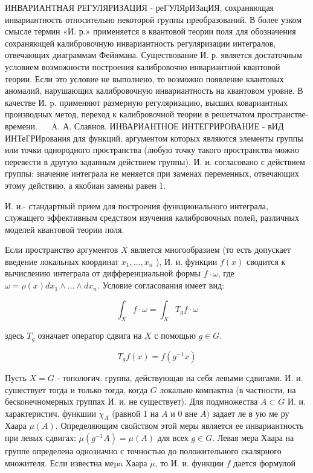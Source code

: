 \documentclass[10pt]{article}
\begin{document}
ИНВАРИАНТНАЯ РЕГУЛЯРИЗАЦИЯ - реГУЛЯрИЗацИЯ, сохраняющая инвариантность относительно некоторой группы преобразований. В более узком смысле термин «И. р.» применяется в квантовой теории поля для обозначения сохраняющей калибровочную инвариантность регуляризации интегралов, отвечающих диаграммам Фейнмана. Существование И. р. является достаточным условием возможности построения калибровочно инвариантной квантовой теории. Если это условие не выполнено, то возможно появление квантовых аномалий, нарушающих калибровочную инвариантность на квантовом уровне. В качестве И. p. применяют размерную регуляризацию, высших ковариантных производных метод, переход к калибровочной теории в решетчатом пространстве-времени. $\quad$ A. А. Славнов. ИНВАРИАНТНОЕ ИНТЕГРИРОВАНИЕ - вИД ИНТеГРИрования для функций, аргументом которых являются элементы группы или точки однородного пространства (любую точку такого пространства можно перевести в другую заданным действием группы). И. и. согласовано с действием группы: значение интеграла не меняется при заменах переменных, отвечающих этому действию, а якобиан замены равен 1.



И. и.- стандартный прием для построения функционального интеграла, служащего эффективным средством изучения калибровочных полей, различных моделей квантовой теории поля.



Если пространство аргументов $X$ является многообразием (то есть допускает введение локальных координат $x_{1}, \ldots, x_{n}$ ), И. и. функции $f(x)$ сводится к вычислению интеграла от дифференциальной формы $f \cdot \omega$, где $\omega=\rho(x) d x_{1} \wedge \ldots \wedge d x_{n}$. Условие согласования имеет вид:



\[

\int_{X} f \cdot \omega=\int_{X} T_{g} f \cdot \omega

\]



здесь $T_{g}$ означает оператор сдвига на $X$ с помощью $g \in G$.



\[

T_{g} f(x)=f\left(g^{-1} x\right)

\]



Пусть $X=G$ - топологич. группа, действующая на себя левыми сдвигами. И. и. сушествует тогда и только тогда, когда $G$ локально компактна (в частности, на бесконечномерных группах И. и. не существует). Для подмножества $A \subset G$ И. и. характеристич. функшии $\chi_{A}$ (равной 1 на $A$ и 0 вне $A)$ задает ле в ую ме ру Хаара $\mu(A)$. Определяющим свойством этой меры является ее инвариантность при левых сдвигах: $\mu\left(g^{-1} A\right)=\mu(A)$ для всех $g \in G$. Левая мера Хаара на группе определена однозначно с точностью до положительного скалярного множителя. Если известна меpa Хаара $\mu$, то И. и. функции $f$ дается формулой
\end{document}
